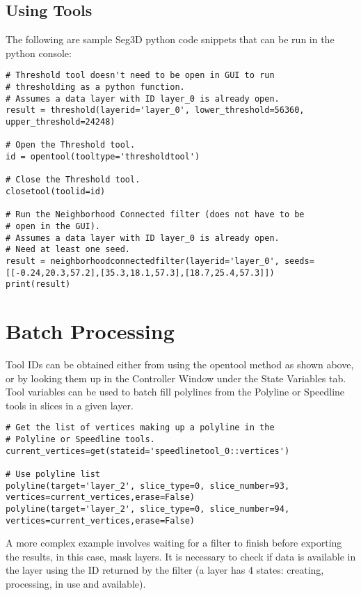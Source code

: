 \documentclass[fleqn,11pt,openany]{book}
\begin{document}
\section{Using Tools}

The following are sample Seg3D python code snippets that can be run in the python console:

\begin{lstlisting}[frame=single]
# Threshold tool doesn't need to be open in GUI to run
# thresholding as a python function.
# Assumes a data layer with ID layer_0 is already open.
result = threshold(layerid='layer_0', lower_threshold=56360, upper_threshold=24248)

# Open the Threshold tool.
id = opentool(tooltype='thresholdtool')

# Close the Threshold tool.
closetool(toolid=id)

# Run the Neighborhood Connected filter (does not have to be
# open in the GUI).
# Assumes a data layer with ID layer_0 is already open.
# Need at least one seed.
result = neighborhoodconnectedfilter(layerid='layer_0', seeds=[[-0.24,20.3,57.2],[35.3,18.1,57.3],[18.7,25.4,57.3]])
print(result)
\end{lstlisting}

\chapter{Batch Processing}

Tool IDs can be obtained either from using the opentool method as shown above, or by looking them up in the Controller Window under the State Variables tab. Tool variables can be used to batch fill polylines from the Polyline or Speedline tools in slices in a given layer.

\begin{lstlisting}[frame=single]
# Get the list of vertices making up a polyline in the
# Polyline or Speedline tools.
current_vertices=get(stateid='speedlinetool_0::vertices')

# Use polyline list
polyline(target='layer_2', slice_type=0, slice_number=93, vertices=current_vertices,erase=False)
polyline(target='layer_2', slice_type=0, slice_number=94, vertices=current_vertices,erase=False)
\end{lstlisting}

A more complex example involves waiting for a filter to finish before exporting the results, in this case, mask layers. It is necessary to check if data is available in the layer using the ID returned by the filter (a layer has 4 states: creating, processing, in use and available).
\end{document}
